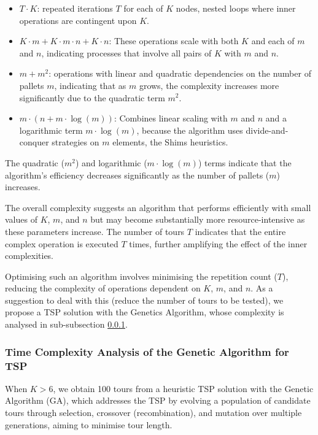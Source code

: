 \documentclass[preprint,authoryear]{elsarticle}
\begin{document}
{\begin{itemize}
	\item $T \cdot K$: repeated iterations $T$ for each of $K$ nodes, nested loops where inner operations are contingent upon $K$.
	\item $K \cdot m + K \cdot m \cdot n + K \cdot n$: These operations scale with both $K$ and each of $m$ and $n$, indicating processes that involve all pairs of $K$ with $m$ and $n$.
	\item $m + m^2$: operations with linear and quadratic dependencies on the number of pallets $m$, indicating that as $m$ grows, the complexity increases more significantly due to the quadratic term $m^2$.
	\item $m \cdot (n + m \cdot \log(m))$: Combines linear scaling with $m$ and $n$ and a logarithmic term $m \cdot \log(m)$, because the algorithm uses divide-and-conquer strategies on $m$ elements, the Shims heuristics.
\end{itemize}

The quadratic ($m^2$) and logarithmic ($m \cdot \log(m)$) terms indicate that the algorithm's efficiency decreases significantly as the number of pallets ($m$) increases.

The overall complexity suggests an algorithm that performs efficiently with small values of $K$, $m$, and $n$ but may become substantially more resource-intensive as these parameters increase. The number of tours $T$ indicates that the entire complex operation is executed $T$ times, further amplifying the effect of the inner complexities.

Optimising such an algorithm involves minimising the repetition count ($T$), reducing the complexity of operations dependent on $K$, $m$, and $n$.
As a suggestion to deal with this (reduce the number of tours to be tested), we propose a TSP solution with the Genetics Algorithm, whose complexity is analysed in sub-subsection \ref{ga_tsp}.

\subsubsection{Time Complexity Analysis of the Genetic Algorithm for TSP}
\label{ga_tsp}

When $K > 6$, we obtain 100 tours from a heuristic TSP solution with the Genetic Algorithm (GA), which addresses the TSP by evolving a population of candidate tours through selection, crossover (recombination), and mutation over multiple generations, aiming to minimise tour length.

}
\end{document}
